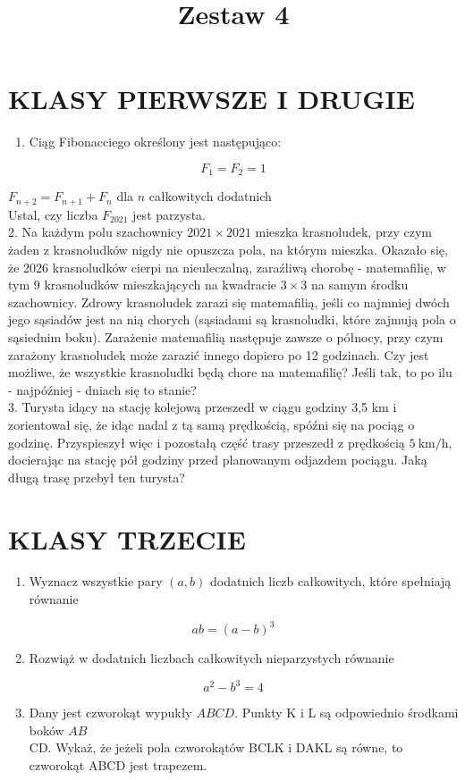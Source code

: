 \documentclass[10pt]{article}
\title{Zestaw 4 }
\author{}
\date{}
\begin{document}
\maketitle
\section*{KLASY PIERWSZE I DRUGIE}
\begin{enumerate}
  \item Ciąg Fibonacciego określony jest następująco:
\end{enumerate}

\[
F_{1}=F_{2}=1
\]

\(F_{n+2}=F_{n+1}+F_{n}\) dla \(n\) całkowitych dodatnich\\
Ustal, czy liczba \(F_{2021}\) jest parzysta.\\
2. Na każdym polu szachownicy \(2021 \times 2021\) mieszka krasnoludek, przy czym żaden z krasnoludków nigdy nie opuszcza pola, na którym mieszka. Okazało się, że 2026 krasnoludków cierpi na nieuleczalną, zaraźliwą chorobę - matemafilię, w tym 9 krasnoludków mieszkających na kwadracie \(3 \times 3\) na samym środku szachownicy. Zdrowy krasnoludek zarazi się matemafilią, jeśli co najmniej dwóch jego sąsiadów jest na nią chorych (sąsiadami są krasnoludki, które zajmują pola o sąsiednim boku). Zarażenie matemafilią następuje zawsze o północy, przy czym zarażony krasnoludek może zarazić innego dopiero po 12 godzinach. Czy jest możliwe, że wszystkie krasnoludki będą chore na matemafilię? Jeśli tak, to po ilu - najpóźniej - dniach się to stanie?\\
3. Turysta idący na stację kolejową przeszedł w ciągu godziny 3,5 km i zorientował się, że idąc nadal z tą samą prędkością, spóźni się na pociąg o godzinę. Przyspieszył więc i pozostałą część trasy przeszedł z prędkością \(5 \mathrm{~km} / \mathrm{h}\), docierając na stację pół godziny przed planowanym odjazdem pociągu. Jaką długą trasę przebył ten turysta?

\section*{KLASY TRZECIE}
\begin{enumerate}
  \item Wyznacz wszystkie pary \((a, b)\) dodatnich liczb całkowitych, które spełniają równanie
\end{enumerate}

\[
a b=(a-b)^{3}
\]

\begin{enumerate}
  \setcounter{enumi}{1}
  \item Rozwiąż w dodatnich liczbach całkowitych nieparzystych równanie
\end{enumerate}

\[
a^{2}-b^{3}=4
\]

\begin{enumerate}
  \setcounter{enumi}{2}
  \item Dany jest czworokąt wypukły \(A B C D\). Punkty K i L są odpowiednio środkami boków \(A B\)\\
CD. Wykaż, że jeżeli pola czworokątów BCLK i DAKL są równe, to czworokąt ABCD jest trapezem.
\end{enumerate}
\end{document}
